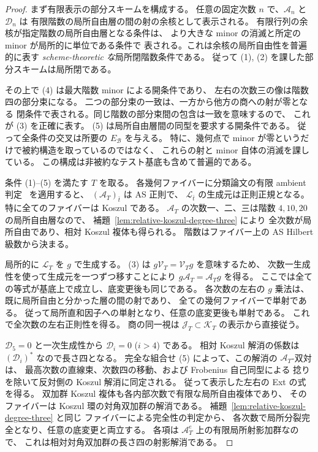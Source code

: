 \begin{proof}
まず有限表示の部分スキームを構成する。
任意の固定次数 $n$ で、$\mathcal A_n$ と $\mathcal D_n$ は
有限階数の局所自由層の間の射の余核として表示される。
有限行列の余核が指定階数の局所自由層となる条件は、
より大きな minor の消滅と所定の minor が局所的に単位である条件で
表される。これは余核の局所自由性を普遍的に表す
\emph{scheme-theoretic な}局所閉階数条件である。
従って (1), (2) を課した部分スキームは局所閉である。

その上で (4) は最大階数 minor による開条件であり、
左右の次数三の像は階数四の部分束になる。
二つの部分束の一致は、一方から他方の商への射が零となる
閉条件で表される。同じ階数の部分束間の包含は一致を意味するので、
これが (3) を正確に表す。
(5) は局所自由層間の同型を要求する開条件である。
従って全条件の交叉は所要の $E_{\mathcal B}$ を与える。
特に、幾何点で minor が零というだけで被約構造を取っているのではなく、
これらの射と minor 自体の消滅を課している。
この構成は非被約なテスト基底も含めて普遍的である。

条件 (1)--(5) を満たす $T$ を取る。
各幾何ファイバーに分類論文の有限 ambient 判定~\cite[二次 AS 被覆の有限判定]{QuadricIntrinsic2026} を適用すると、
$(\mathcal A_T)_{\bar t}$ は AS 正則で、
$\mathcal L_{\bar t}$ の生成元は正則正規となる。
特に全てのファイバーは Koszul である。
$\mathcal A_T$ の次数一、二、三は階数 $4,10,20$ の局所自由層なので、
補題~\ref{lem:relative-koszul-degree-three} により
全次数が局所自由であり、相対 Koszul 複体も得られる。
階数はファイバー上の AS Hilbert 級数から決まる。

局所的に $\mathcal L_T$ を $g$ で生成する。
(3) は $g\mathcal V_T=\mathcal V_Tg$ を意味するため、
次数一生成性を使って生成元を一つずつ移すことにより
$g\mathcal A_T=\mathcal A_Tg$ を得る。
ここでは全ての等式が基底上で成立し、底変更後も同じである。
各次数の左右の $g$ 乗法は、既に局所自由と分かった層の間の射であり、
全ての幾何ファイバーで単射である。
従って局所直和因子への単射となり、任意の底変更後も単射である。
これで全次数の左右正則性を得る。
商の同一視は $\mathcal J_T\subset\mathcal K_T$ の表示から直接従う。

$\mathcal D_5=0$ と一次生成性から $\mathcal D_i=0$ ($i>4$) である。
相対 Koszul 解消の係数は $(\mathcal D_i)^*$ なので長さ四となる。
完全な組合せ (5) によって、この解消の $\mathcal A_T$-双対は、
最高次数の直線束、次数四の移動、および Frobenius 自己同型による
捻りを除いて反対側の Koszul 解消に同定される。
従って表示した左右の Ext の式を得る。
双加群 Koszul 複体も各内部次数で有限な局所自由複体であり、
そのファイバーは Koszul 環の対角双加群の解消である。
補題~\ref{lem:relative-koszul-degree-three} と同じ
ファイバーによる完全性の判定から、
各次数で局所分裂完全となり、任意の底変更と両立する。
各項は $\mathcal A_T^e$ 上の有限局所射影加群なので、
これは相対対角双加群の長さ四の射影解消である。


\end{proof}
